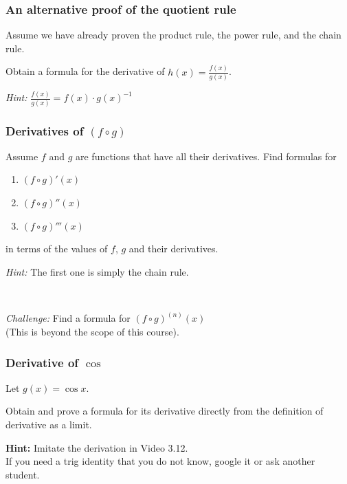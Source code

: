 \begin{frame}[t]
	\frametitle{An alternative proof of the quotient rule}

	Assume we have already proven the product rule, the power rule, and the chain
	rule.

	Obtain a formula for the derivative of
	$\displaystyle h(x) = \frac{f(x)}{g(x)}$.

	\emph{Hint:} $\displaystyle \frac{f(x)}{g(x)}= f(x) \cdot g(x)^{-1}$
\end{frame}

\begin{frame}
	\frametitle{Derivatives of $\displaystyle (f \circ g)$}

	Assume $f$ and $g$ are functions that have all their derivatives. Find formulas
	for
	\begin{enumerate}
		\item $\displaystyle (f \circ g)'(x)$

		\item $\displaystyle (f \circ g)''(x)$

		\item $\displaystyle (f \circ g)'''(x)$
	\end{enumerate}

	in terms of the values of $f$, $g$ and their derivatives.

	\emph{Hint:} The first one is simply the chain rule.

	\

	\emph{Challenge:} Find a formula for $\displaystyle (f \circ g)^{(n)}(x)$ \\ (This
	is beyond the scope of this course).
\end{frame}

\begin{frame}[t]
	\frametitle{Derivative of $\cos$}

	Let $\displaystyle g(x) = \cos x.$

	Obtain and prove a formula for its derivative directly from the definition of derivative
	as a limit.

	\vfill

	{\bfseries Hint:} Imitate the derivation in Video 3.12. \\ If you need a trig identity
	that you do not know, google it or ask another student.




\end{frame}

